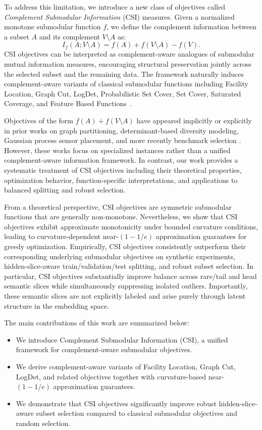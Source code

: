 \documentclass[11pt]{article}
\begin{document}
To address this limitation, we introduce a new class of objectives called \emph{Complement Submodular Information} (CSI) measures. Given a normalized monotone submodular function $f$, we define the complement information between a subset $A$ and its complement $V \setminus A$ as:
\[
I_f(A;V \setminus A)
=
f(A) + f(V \setminus A) - f(V).
\]
CSI objectives can be interpreted as complement-aware analogues of submodular mutual information measures, encouraging structural preservation jointly across the selected subset and the remaining data. The framework naturally induces complement-aware variants of classical submodular functions including Facility Location, Graph Cut, LogDet, Probabilistic Set Cover, Set Cover, Saturated Coverage, and Feature Based Functions~\cite{kulesza2012determinantal,cornuejols1983uncapicitated,feige1998threshold,wei2014unsupervised,iyer2015submodular}.

Objectives of the form $f(A)+f(V\setminus A)$ have appeared implicitly or explicitly in prior works on graph partitioning, determinant-based diversity modeling, Gaussian process sensor placement, and more recently benchmark selection \cite{krause2008near, queyranne1998minimizing, smola2026submodular}. However, these works focus on specialized instances rather than a unified complement-aware information framework. In contrast, our work provides a systematic treatment of CSI objectives including their theoretical properties, optimization behavior, function-specific interpretations, and applications to balanced splitting and robust selection.

From a theoretical perspective, CSI objectives are symmetric submodular functions that are generally non-monotone. Nevertheless, we show that CSI objectives exhibit approximate monotonicity under bounded curvature conditions, leading to curvature-dependent near-$(1-1/e)$ approximation guarantees for greedy optimization. Empirically, CSI objectives consistently outperform their corresponding underlying submodular objectives on synthetic experiments, hidden-slice-aware train/validation/test splitting, and robust subset selection. In particular, CSI objectives substantially improve balance across rare/tail and head semantic slices while simultaneously suppressing isolated outliers. Importantly, these semantic slices are not explicitly labeled and arise purely through latent structure in the embedding space.

The main contributions of this work are summarized below:
\begin{itemize}
    \item We introduce Complement Submodular Information (CSI), a unified framework for complement-aware submodular objectives.

    \item We derive complement-aware variants of Facility Location, Graph Cut, LogDet, and related objectives together with curvature-based near-$(1-1/e)$ approximation guarantees.

    \item We demonstrate that CSI objectives significantly improve robust hidden-slice-aware subset selection compared to classical submodular objectives and random selection.
\end{itemize}
\end{document}
